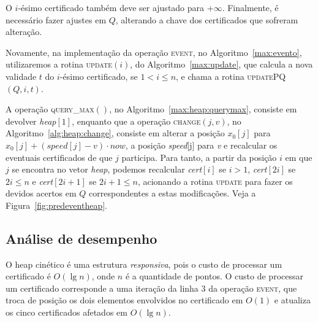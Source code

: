 

O $i$-ésimo certificado também deve ser ajustado para $+\infty$.
Finalmente, é necessário fazer ajustes em $Q$, alterando a chave dos certificados que sofreram
alteração.



Novamente, na implementação da operação \textsc{event}, no Algoritmo~\ref{max:evento},
utilizaremos a rotina \textsc{update}$(i)$, do Algoritmo~\ref{max:update}, que calcula a nova
validade $t$ do $i$-ésimo certificado, se $1 < i \leq n$, e chama a rotina \textsc{updatePQ}$(Q, i,
t)$.





A operação \textsc{query\_max}$()$, no Algoritmo~\ref{max:heap:querymax},
consiste em devolver \textit{heap}$[1]$, enquanto que a operação
\textsc{change}$(j, v)$, no Algoritmo~\ref{alg:heap:change}, consiste em alterar
a posição $x_0[j]$ para ${x_0[j] + (\mathit{speed}[j] - v)\cdot now}$, a posição
\textit{speed}[j] para \textit{v} e recalcular os eventuais certificados de que
$j$ participa.
Para tanto, a partir da posição $i$ em que $j$ se encontra no vetor \textit{heap}, podemos
recalcular \textit{cert}$[i]$ se $i > 1$, \textit{cert}$[2i]$ se $2i \leq n$ e \textit{cert}$[2i +
1]$ se $2i + 1 \leq n$, acionando a rotina \textsc{update} para fazer os devidos acertos em $Q$
correspondentes a estas modificações.
Veja a Figura~\ref{fig:predeventheap}.







\FloatBarrier

\subsection{Análise de desempenho}\label{subsec:heap:analise-de-desempenho}

O heap cinético é uma estrutura \textit{responsiva}, pois o custo de processar
um certificado é $O(\lg{n})$, onde $n$ é a quantidade de pontos.
O custo de processar um certificado corresponde a uma iteração da linha $3$ da operação
\textsc{event}, que troca de posição os dois elementos envolvidos no certificado em $O(1)$ e
atualiza os cinco certificados afetados em $O(\lg{n})$.

